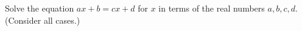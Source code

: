 Solve the equation $ax+b=cx+d$ for $x$ in terms of the real numbers $a,b,c,d$. (Consider all cases.)
